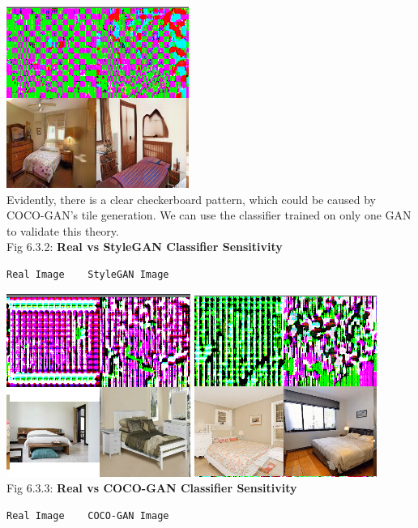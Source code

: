 \documentclass[10pt]{article}
\begin{document}
\begin{multicols*}{2}
        \includegraphics[scale=0.3]{smoothgrad/combined/coco.png}\\
        Evidently, there is a clear checkerboard pattern, which could be caused by COCO-GAN's tile generation\cite{cocogan}. 
        We can use the classifier trained on only one GAN to validate this theory.\\
        Fig 6.3.2: \textbf{Real vs StyleGAN Classifier Sensitivity}
        \begin{verbatim}Real Image    StyleGAN Image\end{verbatim}
        \includegraphics[scale=0.3]{smoothgrad/stylegan/real.png}
        \includegraphics[scale=0.3]{smoothgrad/stylegan/stylegan.png}\\
        Fig 6.3.3: \textbf{Real vs COCO-GAN Classifier Sensitivity}
        \begin{verbatim}Real Image    COCO-GAN Image\end{verbatim}

\end{multicols*}
\end{document}

